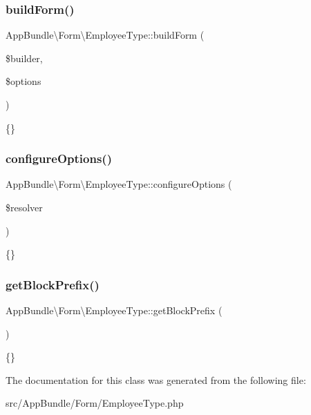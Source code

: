 \subsubsection{\texorpdfstring{build\+Form()}{buildForm()}}
{\footnotesize\ttfamily App\+Bundle\textbackslash{}\+Form\textbackslash{}\+Employee\+Type\+::build\+Form (\begin{DoxyParamCaption}\item[{Form\+Builder\+Interface}]{\$builder,  }\item[{array}]{\$options }\end{DoxyParamCaption})}

\{\} \mbox{\label{class_app_bundle_1_1_form_1_1_employee_type_a09552cba014fd6ff78910a1797099522}} 
\subsubsection{\texorpdfstring{configure\+Options()}{configureOptions()}}
{\footnotesize\ttfamily App\+Bundle\textbackslash{}\+Form\textbackslash{}\+Employee\+Type\+::configure\+Options (\begin{DoxyParamCaption}\item[{Options\+Resolver}]{\$resolver }\end{DoxyParamCaption})}

\{\} \mbox{\label{class_app_bundle_1_1_form_1_1_employee_type_a4ebe090c2e4427b91372e9cdc6b935f0}} 
\subsubsection{\texorpdfstring{get\+Block\+Prefix()}{getBlockPrefix()}}
{\footnotesize\ttfamily App\+Bundle\textbackslash{}\+Form\textbackslash{}\+Employee\+Type\+::get\+Block\+Prefix (\begin{DoxyParamCaption}{ }\end{DoxyParamCaption})}

\{\} 

The documentation for this class was generated from the following file\+:\begin{DoxyCompactItemize}
\item 
src/\+App\+Bundle/\+Form/Employee\+Type.\+php\end{DoxyCompactItemize}
